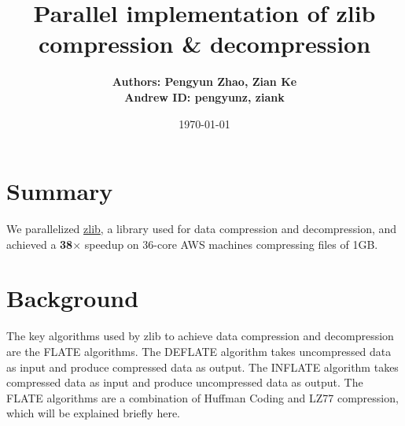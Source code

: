 \documentclass[12pt]{article}
\title{Parallel implementation of zlib compression \& decompression}
\author{\textbf{Authors: Pengyun Zhao, Zian Ke}\\\textbf{Andrew ID: pengyunz, ziank}}
\date{\today}
\begin{document}
\maketitle
\section{Summary}
    We parallelized \href{https://www.zlib.net/}{zlib}, a library used for data compression and decompression, and achieved a \textbf{38$\times$} speedup on 36-core AWS machines compressing files of 1GB.
\section{Background}
    The key algorithms used by zlib to achieve data compression and decompression are the FLATE algorithms. The DEFLATE algorithm takes uncompressed data as input and produce compressed data as output. The INFLATE algorithm takes compressed data as input and produce uncompressed data as output. The FLATE algorithms are a combination of Huffman Coding and LZ77 compression, which will be explained briefly here.
\end{document}
